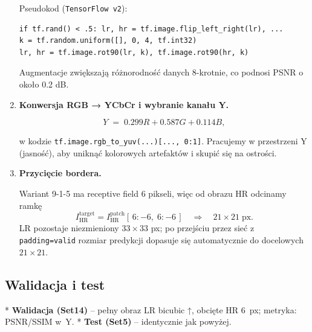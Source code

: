 \documentclass[11pt]{article}
\begin{document}
\begin{enumerate}
\noindent
Pseudokod (\texttt{TensorFlow v2}):

\begin{verbatim}
if tf.rand() < .5: lr, hr = tf.image.flip_left_right(lr), ...
k = tf.random.uniform([], 0, 4, tf.int32)
lr, hr = tf.image.rot90(lr, k), tf.image.rot90(hr, k)
\end{verbatim}

Augmentacje zwiększają różnorodność danych 8-krotnie, co podnosi PSNR
o około 0.2 dB.

\item \textbf{Konwersja RGB → YCbCr i wybranie kanału Y.}

\[
  Y \;=\; 0.299R + 0.587G + 0.114B,
\]

\noindent
w kodzie \texttt{tf.image.rgb\_to\_yuv(...)[...,\,0:1]}.
Pracujemy w przestrzeni Y (jasność), aby uniknąć kolorowych
artefaktów i skupić się na ostrości.

\item \textbf{Przycięcie bordera.}

Wariant 9-1-5 ma receptive field 6 pikseli,
więc od obrazu HR odcinamy ramkę
\[
  I_\mathrm{HR}^{\mathrm{target}} =
  I_\mathrm{HR}^{\mathrm{patch}}[\,6:-6,\;6:-6\,]
  \quad\Longrightarrow\quad 21\times21\;\text{px}.
\]
LR pozostaje niezmieniony \(33\times33\) px; po przejściu przez sieć z
\texttt{padding=valid} rozmiar predykcji dopasuje się automatycznie do
docelowych \(21\times21\).

\end{enumerate}



\subsection{Walidacja i test}

* \textbf{Walidacja (Set14)} – pełny obraz LR bicubic ↑, obcięte HR
\(6\)~px; metryka: PSNR/SSIM w~Y.
* \textbf{Test (Set5)} – identycznie jak powyżej.
\end{document}
